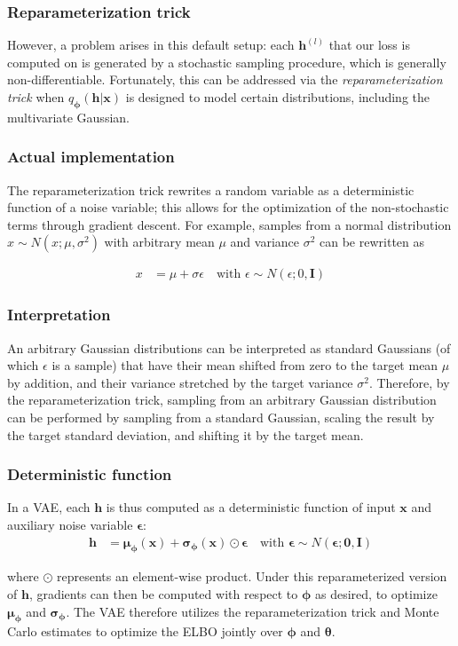 \documentclass{beamer}
\begin{document}
\begin{frame}
\frametitle{Reparameterization trick}

However, a problem arises in this default setup: each $\bm{h}^{(l)}$
that our loss is computed on is generated by a stochastic sampling
procedure, which is generally non-differentiable.  Fortunately, this
can be addressed via the \textit{reparameterization trick} when
$q_{\bm{\phi}}(\bm{h}|\bm{x})$ is designed to model certain
distributions, including the multivariate Gaussian.
\end{frame}

\begin{frame}
\frametitle{Actual implementation}

The reparameterization trick rewrites a random variable as a
deterministic function of a noise variable; this allows for the
optimization of the non-stochastic terms through gradient descent.
For example, samples from a normal distribution
$x \sim N(x;\mu, \sigma^2)$ with arbitrary mean $\mu$ and
variance $\sigma^2$ can be rewritten as

\begin{align*}
    x &= \mu + \sigma\epsilon \quad \text{with } \epsilon \sim N(\epsilon; 0, \bm{I})
\end{align*}
\end{frame}

\begin{frame}
\frametitle{Interpretation}

An arbitrary Gaussian distributions can be interpreted as
standard Gaussians (of which $\epsilon$ is a sample) that have their
mean shifted from zero to the target mean $\mu$ by addition, and their
variance stretched by the target variance $\sigma^2$.  Therefore, by
the reparameterization trick, sampling from an arbitrary Gaussian
distribution can be performed by sampling from a standard Gaussian,
scaling the result by the target standard deviation, and shifting it
by the target mean.
\end{frame}

\begin{frame}
\frametitle{Deterministic function}

In a VAE, each $\bm{h}$ is thus computed as a deterministic function of input $\bm{x}$ and auxiliary noise variable $\bm{\epsilon}$:
\begin{align*}
    \bm{h} &= \bm{\mu}_{\bm{\phi}}(\bm{x}) + \bm{\sigma}_{\bm{\phi}}(\bm{x})\odot\bm{\epsilon} \quad \text{with } \bm{\epsilon} \sim N(\bm{\epsilon};\bm{0}, \textbf{I})
\end{align*}

where $\odot$ represents an element-wise product.  Under this
reparameterized version of $\bm{h}$, gradients can then be computed
with respect to $\bm{\phi}$ as desired, to optimize
$\bm{\mu}_{\bm{\phi}}$ and $\bm{\sigma}_{\bm{\phi}}$.  The VAE
therefore utilizes the reparameterization trick and Monte Carlo
estimates to optimize the ELBO jointly over $\bm{\phi}$ and
$\bm{\theta}$.
\end{frame}
\end{document}

